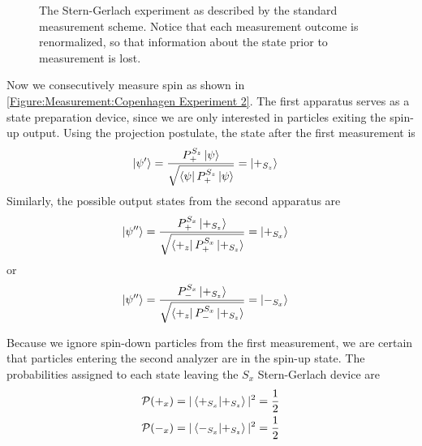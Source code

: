 \begin{figure}
\centering\CaptionFontSize
{}
\caption[Insert an abbreviated caption here to show in the List of Figures]
{The Stern-Gerlach experiment as described by the standard measurement scheme. Notice that each measurement outcome is renormalized, so that information about the state prior to measurement is lost.}
\label{Figure:Measurement:Copenhagen Experiment 2}
\end{figure}

Now we consecutively measure spin as shown in \autoref{Figure:Measurement:Copenhagen Experiment 2}. The first apparatus serves as a state preparation device, since we are only interested in particles exiting the spin-up output. Using the projection postulate, the state after the first measurement is
\begin{align}
    \ket{\psi^\prime} &= \frac{{P^{S_z}_+}\ket{\psi}}{\sqrt{\bra{\psi}P^{S_z}_+\ket{\psi}}} = \ket{+_{S_z}}
\end{align}
Similarly, the possible output states from the second apparatus are
\begin{align}
  \ket{\psi^{\prime\prime}} &= \frac{P^{S_x}_+\ket{+_{S_z}}}{\sqrt{\bra{+_z}P^{S_x}_+\ket{+_{S_z}}}} = \ket{+_{S_x}}
\end{align}
or
\begin{align}
  \ket{\psi^{\prime\prime}} &= \frac{P^{S_x}_-\ket{+_{S_z}}}{\sqrt{\bra{+_z}P^{S_x}_-\ket{+_{S_z}}}} = \ket{-_{S_x}}
\end{align}

Because we ignore spin-down particles from the first measurement, we are certain that particles entering the second analyzer are in the spin-up state. The probabilities assigned to each state leaving the $S_x$ Stern-Gerlach device are
\begin{align} \label{eq:standard conditional probabilites}
    \mathcal{P}(+_x) &= |\braket{+_{S_x}|+_{S_z}}|^2 = \frac{1}{2} \\ \nonumber
    \mathcal{P}(-_x) &= |\braket{-_{S_x}|+_{S_z}}|^2 = \frac{1}{2}
\end{align}

